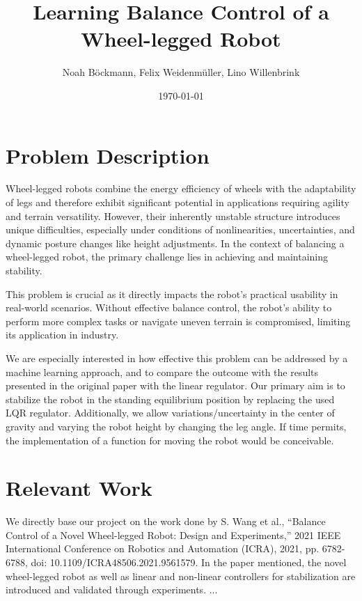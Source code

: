 \documentclass[a4paper]{article}
\title{Learning Balance Control of a Wheel-legged Robot}
\author{Noah Böckmann, Felix Weidenmüller, Lino Willenbrink}
\date{\today}
\begin{document}
\maketitle
\section{Problem Description}
Wheel-legged robots combine the energy efficiency of wheels with the adaptability of legs and therefore exhibit significant potential in applications requiring agility and terrain versatility.
However, their inherently unstable structure introduces unique difficulties, especially under conditions of nonlinearities, uncertainties, and dynamic posture changes like height adjustments.
In the context of balancing a wheel-legged robot, the primary challenge lies in achieving and maintaining stability.

This problem is crucial as it directly impacts the robot's practical usability in real-world scenarios.
Without effective balance control, the robot's ability to perform more complex tasks or navigate uneven terrain is compromised, limiting its application in industry.

We are especially interested in how effective this problem can be addressed by a machine learning approach, and to compare the outcome with the results presented in the original paper with the linear regulator.
Our primary aim is to stabilize the robot in the standing equilibrium position by replacing the used LQR regulator. Additionally, we allow variations/uncertainty in the center of gravity and varying the robot height by changing the leg angle.
If time permits, the implementation of a function for moving the robot would be conceivable.


\section{Relevant Work}
We directly base our project on the work done by S. Wang et al., ``Balance Control of a Novel Wheel-legged Robot: Design and Experiments,'' 2021 IEEE International Conference on Robotics and Automation (ICRA), 2021, pp. 6782-6788, doi: 10.1109/ICRA48506.2021.9561579. In the paper mentioned, the novel wheel-legged robot as well as linear and non-linear controllers for stabilization are introduced and validated through experiments.
... \newline
\end{document}
